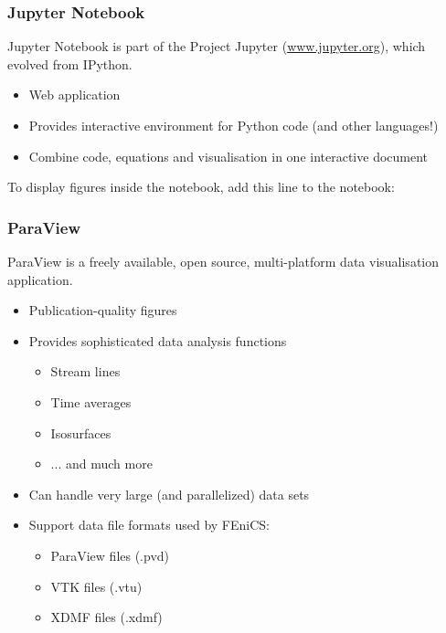 \begin{frame}[fragile]
  \frametitle{Jupyter Notebook}

  Jupyter Notebook is part of the Project Jupyter ({\blue\url{www.jupyter.org}}), which evolved from IPython.
  \begin{itemize}
    \item Web application
    \item Provides interactive environment for Python code (and other languages!)
    \item Combine code, equations and visualisation in one interactive document

  \end{itemize}
To display figures inside the notebook, add this line to the notebook:
\begin{python}
\end{python}

\end{frame}
\begin{frame}[fragile]
\frametitle{ParaView}

  ParaView is a freely available, open source, multi-platform data visualisation application.
\begin{itemize}

  \item Publication-quality figures

  \item Provides sophisticated data analysis functions
    \begin{itemize}
      \item Stream lines
      \item Time averages
      \item Isosurfaces
      \item ... and much more
    \end{itemize}

  \item Can handle very large (and parallelized) data sets

  \item Support data file formats used by FEniCS:
    \begin{itemize}
      \item ParaView files (.pvd)
      \item VTK files (.vtu)
      \item XDMF files (.xdmf)
    \end{itemize}
\end{itemize}
\end{frame}

